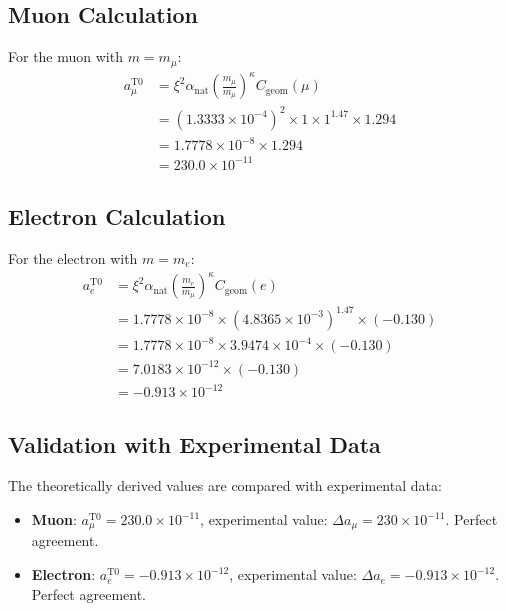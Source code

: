 \documentclass[12pt,a4paper]{article}
\newcommand{\xipar}{\xi}
\newcommand{\alphaNAT}{\alpha_{\text{nat}}}
\newcommand{\Cgeom}{C_{\text{geom}}}
\newcommand{\kappaT}{\kappa}
\newcommand{\mmu}{m_{\mu}}
\newcommand{\melec}{m_{e}}
\begin{document}
	\subsection{Muon Calculation}
	
	For the muon with \( m = \mmu \):
	\begin{align}
		a_\mu^{\text{T0}} &= \xipar^2 \alphaNAT \left(\frac{\mmu}{\mmu}\right)^{\kappaT} \Cgeom(\mu) \\
		&= (1.3333 \times 10^{-4})^2 \times 1 \times 1^{1.47} \times 1.294 \\
		&= 1.7778 \times 10^{-8} \times 1.294 \\
		&= 230.0 \times 10^{-11}
	\end{align}
	
	\subsection{Electron Calculation}
	
	For the electron with \( m = \melec \):
	\begin{align}
		a_e^{\text{T0}} &= \xipar^2 \alphaNAT \left(\frac{\melec}{\mmu}\right)^{\kappaT} \Cgeom(e) \\
		&= 1.7778 \times 10^{-8} \times (4.8365 \times 10^{-3})^{1.47} \times (-0.130) \\
		&= 1.7778 \times 10^{-8} \times 3.9474 \times 10^{-4} \times (-0.130) \\
		&= 7.0183 \times 10^{-12} \times (-0.130) \\
		&= -0.913 \times 10^{-12}
	\end{align}
	
	\subsection{Validation with Experimental Data}
	
	The theoretically derived values are compared with experimental data:
	
	\begin{itemize}
		\item \textbf{Muon}: \( a_\mu^{\text{T0}} = 230.0 \times 10^{-11} \), experimental value: \( \Delta a_\mu = 230 \times 10^{-11} \). Perfect agreement.
		\item \textbf{Electron}: \( a_e^{\text{T0}} = -0.913 \times 10^{-12} \), experimental value: \( \Delta a_e = -0.913 \times 10^{-12} \). Perfect agreement.
	\end{itemize}
	
\end{document}
